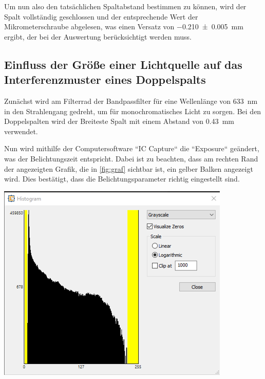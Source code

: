 \documentclass[11pt,ngerman]{scrartcl}
\begin{document}
\noindent Um nun also den tatsächlichen Spaltabstand bestimmen zu können, wird der Spalt vollständig geschlossen und der entsprechende Wert der Mikrometerschraube abgelesen, was einen Versatz von \SI{-0.210(5)}{mm} ergibt, der bei der Auswertung berücksichtigt werden muss.


\subsection{Einfluss der Größe einer Lichtquelle auf das Interferenzmuster eines Doppelspalts}

Zunächst wird am Filterrad der Bandpassfilter für eine Wellenlänge von
\SI{633}{\nm} in den Strahlengang gedreht, um für monochromatisches Licht zu
sorgen. Bei den Doppelspalten wird der Breiteste Spalt mit einem Abstand von
\SI{0.43}{mm} verwendet.

\vspace{2mm}

\noindent Nun wird mithilfe der Computersoftware ``IC Capture`` die ``Exposure`` geändert, was der Belichtungszeit entspricht. Dabei ist zu beachten, dass am rechten Rand der angezeigten Grafik, die in \autoref{fig:graf} sichtbar ist, ein gelber Balken angezeigt wird. Dies bestätigt, dass die Belichtungsparameter richtig eingestellt sind.

\begin{center}
	\begin{minipage}[t]{0.7\textwidth}
		\includegraphics[width=\textwidth]{graf}
		\label{fig:graf}
	\end{minipage}
\end{center}
\end{document}
